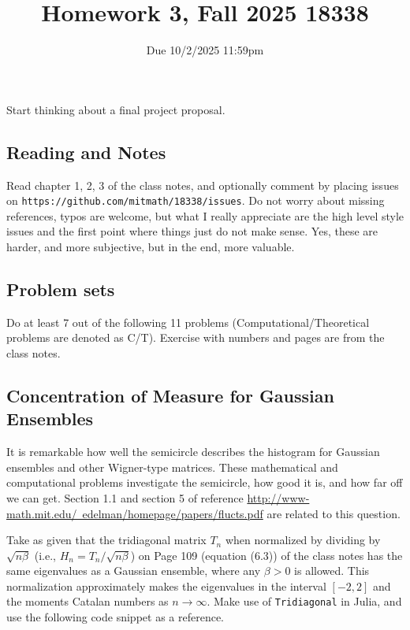 \documentclass{article}
\title{Homework 3, Fall 2025 18338}
\author{Due 10/2/2025 11:59pm}
\date{}
\begin{document}
\maketitle



Start thinking about a final project proposal.

\subsection*{Reading and Notes}
Read chapter 1, 2, 3 of the class notes, and optionally comment  by placing  issues on \verb+https://github.com/mitmath/18338/issues+.
Do not worry about missing references, typos are welcome, but what I really appreciate are
the high level style issues and the first point where things just do  not make sense.
Yes, these are harder, and more subjective, but in the end, more valuable.


\subsection*{Problem sets}
Do at least 7 out of the following 11 problems (Computational/Theoretical problems are denoted as C/T). Exercise with numbers and pages are from the class notes.

\subsection*{Concentration of Measure for Gaussian Ensembles}

It is remarkable how well the semicircle describes the histogram for Gaussian ensembles and other Wigner-type matrices. These mathematical and computational problems investigate the semicircle, how good it is, and how far off we can get. Section 1.1 and section 5 of reference \href{http://www-math.mit.edu/~edelman/homepage/papers/flucts.pdf}{http://www-math.mit.edu/~edelman/homepage/papers/flucts.pdf} are related to this question.

Take as given that the tridiagonal matrix $T_n$ when normalized by dividing by $\sqrt{n \beta }$ (i.e., $H_n = T_n/\sqrt{n \beta }$) on Page 109 (equation (6.3)) of the class notes has the same eigenvalues as a Gaussian ensemble, where any $\beta>0$ is allowed. 
This normalization approximately makes the 
eigenvalues in the interval $[-2,2]$ and the moments  Catalan numbers as $n \rightarrow \infty$.
Make use of \verb|Tridiagonal| in Julia, and use the following code snippet as a reference.
\end{document}

